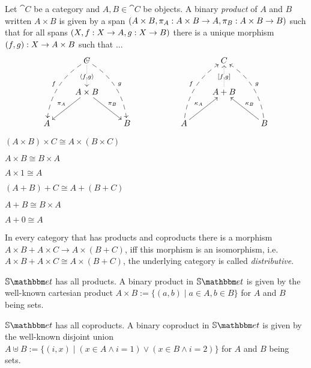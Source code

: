 \begin{mydef}
	Let $\cat{C}$ be a category and $A, B \in \cat{C}$ be objects.
	A binary \emph{product} of $A$ and $B$ written $A \times B$ is given by a span $(A\times B, \arrow{A \times B}{\pi_A}{A}, \arrow{A \times B}{\pi_B}{B})$ such that for all spans $(X,\arrow{X}{f}{A},\arrow{X}{g}{B})$ there is a unique morphism $\arrow{X}{(f,g)}{A\times B}$ such that ...
	\[
	\xymatrix{
		& C \ar@/_1pc/@{-->}[ddl]_{f} \ar\ar@/^1pc/@{-->}[ddr]^{g} \ar@{.>}[d]|{\langle f,g\rangle} &  & & & C & \\
		& A \times B \ar[dl]_{\pi_A} \ar[dr]^{\pi_B} & & &  & A + B \ar@{.>}[u]|{[f,g]} &  \\
		A & & B & & A \ar[ur]^{\kappa_A} \ar@/^1pc/@{-->}[uur]^{f} & & B \ar[ul]_{\kappa_B} \ar@/_1pc/@{-->}[uul]_{g}
	}
	\]
\end{mydef}

\begin{myprop}
	$(A \times B) \times C \cong A \times (B \times C)$
\end{myprop}
\begin{myprop}
	$A \times B \cong B \times A$
\end{myprop}
\begin{myprop}
	$A \times 1 \cong A$
\end{myprop}

\begin{myprop}
	$(A + B) + C \cong A + (B + C)$
\end{myprop}
\begin{myprop}
	$A + B \cong B \times A$
\end{myprop}
\begin{myprop}
	$A + 0 \cong A$
\end{myprop}

\begin{myprop}
In every category that has products and coproducts there is a morphism $A \times B + A \times C \to A \times (B + C)$, iff this morphism is an isomorphism, i.e. $A \times B + A \times C \cong A \times (B + C)$, the underlying category is called \emph{distributive}.
\end{myprop}

\begin{myprop}
	$\catSET$ has all products. 
	A binary product in $\catSET$ is given by the well-known cartesian product $A \times B := \{ (a,b) \mid a \in A, b \in B\}$ for $A$ and $B$ being sets.
\end{myprop}
\begin{myprop}
	$\catSET$ has all coproducts. 
	A binary coproduct in $\catSET$ is given by the well-known disjoint union $A \uplus B := \{ (i,x) \mid (x \in A \wedge i = 1) \vee (x \in B \wedge i = 2) \}$ for $A$ and $B$ being sets. 
\end{myprop}

